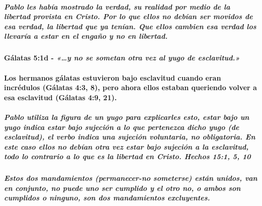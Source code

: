 \documentclass[11a pt,twoside]{article}
\newcommand{\scripture}[1]{%
  {\fontsize{12pt}{16pt}\selectfont\ScriptureFont\itshape #1}%
}
\let\oldparagraph\paragraph
\renewcommand{\paragraph}{\needspace{3\baselineskip}\oldparagraph}
\let\oldsubparagraph\subparagraph
\renewcommand{\subparagraph}{\needspace{2\baselineskip}\oldsubparagraph}
\begin{document}
\subparagraph{Pablo les había mostrado la verdad, su realidad por medio
de la libertad provista en Cristo. Por lo que ellos no debían ser
movidos de esa verdad, la libertad que ya tenían. Que ellos cambien esa
verdad los llevaría a estar en el engaño y no en
libertad.}\label{pablo-les-habuxeda-mostrado-la-verdad-su-realidad-por-medio-de-la-libertad-provista-en-cristo.-por-lo-que-ellos-no-debuxedan-ser-movidos-de-esa-verdad-la-libertad-que-ya-tenuxedan.-que-ellos-cambien-esa-verdad-los-llevaruxeda-a-estar-en-el-engauxf1o-y-no-en-libertad.}

\paragraph{\texorpdfstring{Gálatas 5:1d -
\scripture{«…y no se sometan otra vez al yugo de esclavitud.»}}{Gálatas 5:1d - }}\label{guxe1latas-51d---y-no-se-sometan-otra-vez-al-yugo-de-esclavitud.}

\paragraph{Los hermanos gálatas estuvieron bajo esclavitud cuando eran
incrédulos (Gálatas 4:3, 8), pero ahora ellos estaban queriendo volver a
esa esclavitud (Gálatas 4:9,
21).}\label{los-hermanos-guxe1latas-estuvieron-bajo-esclavitud-cuando-eran-incruxe9dulos-guxe1latas-43-8-pero-ahora-ellos-estaban-queriendo-volver-a-esa-esclavitud-guxe1latas-49-21.}

\subparagraph{Pablo utiliza la figura de un yugo para explicarles esto,
estar bajo un yugo indica estar bajo sujeción a lo que pertenezca dicho
yugo (de esclavitud), el verbo indica una sujeción voluntaria, no
obligatoria. En este caso ellos no debían otra vez estar bajo sujeción a
la esclavitud, todo lo contrario a lo que es la libertad en Cristo.
Hechos 15:1, 5,
10}\label{pablo-utiliza-la-figura-de-un-yugo-para-explicarles-esto-estar-bajo-un-yugo-indica-estar-bajo-sujeciuxf3n-a-lo-que-pertenezca-dicho-yugo-de-esclavitud-el-verbo-indica-una-sujeciuxf3n-voluntaria-no-obligatoria.-en-este-caso-ellos-no-debuxedan-otra-vez-estar-bajo-sujeciuxf3n-a-la-esclavitud-todo-lo-contrario-a-lo-que-es-la-libertad-en-cristo.-hechos-151-5-10}

\subparagraph{Estos dos mandamientos (permanecer-no someterse) están
unidos, van en conjunto, no puede uno ser cumplido y el otro no, o ambos
son cumplidos o ninguno, son dos mandamientos
excluyentes.}\label{estos-dos-mandamientos-permanecer-no-someterse-estuxe1n-unidos-van-en-conjunto-no-puede-uno-ser-cumplido-y-el-otro-no-o-ambos-son-cumplidos-o-ninguno-son-dos-mandamientos-excluyentes.}
\end{document}
